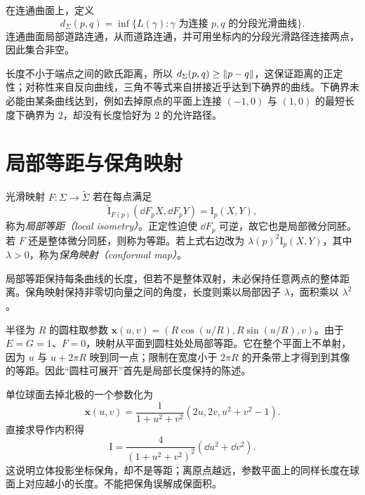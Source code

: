 \begin{definition}[内蕴距离]
在连通曲面上，定义
\[
 d_\Sigma(p,q)=\inf\{L(\gamma):\gamma\text{ 为连接 }p,q\text{ 的分段光滑曲线}\}.
\]
连通曲面局部道路连通，从而道路连通，并可用坐标内的分段光滑路径连接两点，因此集合非空。
\end{definition}
长度不小于端点之间的欧氏距离，所以 $d_\Sigma(p,q)\ge\lVert p-q\rVert$，这保证距离的正定性；对称性来自反向曲线，三角不等式来自拼接近乎达到下确界的曲线。下确界未必能由某条曲线达到，例如去掉原点的平面上连接 $(-1,0)$ 与 $(1,0)$ 的最短长度下确界为 $2$，却没有长度恰好为 $2$ 的允许路径。

\section{局部等距与保角映射}
\begin{definition}[等距与保角]
光滑映射 $F:\Sigma\to\widetilde\Sigma$ 若在每点满足
\[
 \widetilde{\mathrm I}_{F(p)}(\dd F_pX,\dd F_pY)=\mathrm I_p(X,Y),
\]
称为\emph{局部等距（local isometry）}。正定性迫使 $\dd F_p$ 可逆，故它也是局部微分同胚。若 $F$ 还是整体微分同胚，则称为等距。若上式右边改为 $\lambda(p)^2\mathrm I_p(X,Y)$，其中 $\lambda>0$，称为\emph{保角映射（conformal map）}。
\end{definition}
局部等距保持每条曲线的长度，但若不是整体双射，未必保持任意两点的整体距离。保角映射保持非零切向量之间的角度，长度则乘以局部因子 $\lambda$，面积乘以 $\lambda^2$。

\begin{example}[圆柱展开]\label{exam:dg-cylinder-isometry}
半径为 $R$ 的圆柱取参数 $\mathbf x(u,v)=(R\cos(u/R),R\sin(u/R),v)$。由于 $E=G=1$、$F=0$，映射从平面到圆柱处处局部等距。它在整个平面上不单射，因为 $u$ 与 $u+2\pi R$ 映到同一点；限制在宽度小于 $2\pi R$ 的开条带上才得到到其像的等距。因此“圆柱可展开”首先是局部长度保持的陈述。
\end{example}

\begin{example}[球面的立体投影坐标]\label{exam:dg-stereographic}
单位球面去掉北极的一个参数化为
\[
 \mathbf x(u,v)=\frac1{1+u^2+v^2}(2u,2v,u^2+v^2-1).
\]
直接求导作内积得
\begin{equation}
 \mathrm I=\frac4{(1+u^2+v^2)^2}(\dd u^2+\dd v^2).
 \label{eq:dg-stereo-metric}
\end{equation}
这说明立体投影坐标保角，却不是等距；离原点越远，参数平面上的同样长度在球面上对应越小的长度。不能把保角误解成保面积。
\end{example}

